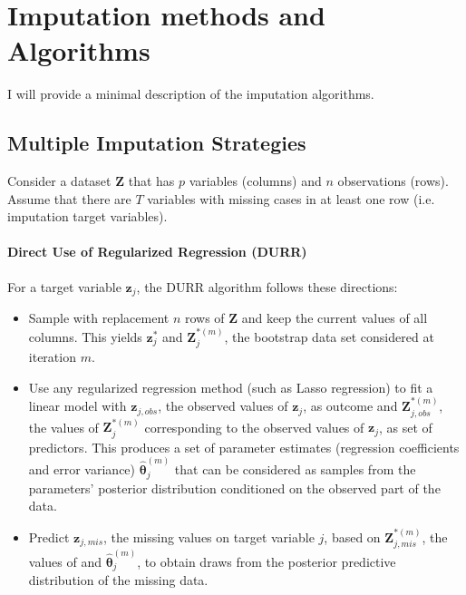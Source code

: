 \maketitle
\section{Imputation methods and Algorithms}

I will provide a minimal description of the imputation algorithms.

\subsection{Multiple Imputation Strategies}

	Consider a dataset $\bm{Z}$ that has $p$ variables (columns) and $n$ observations (rows).
	Assume that there are $T$ variables with missing cases in at least one row (i.e. imputation
	target variables).

\paragraph{Direct Use of Regularized Regression (DURR)}

	For a target variable $\bm{z}_j$, the DURR algorithm follows these directions:

	\begin{itemize}

	\item Sample with replacement $n$ rows of $\bm{Z}$ and keep the current values of all columns. This yields
		$\bm{z}_{j}^{*}$ and $\bm{Z}_{j}^{*(m)}$, the bootstrap data set considered at iteration $m$.

	\item Use any regularized regression method (such as Lasso regression) to fit a linear model with
		$\bm{z}_{j,obs}$, the observed values of $\bm{z}_j$, as outcome and $\bm{Z}_{j,obs}^{*(m)}$,
		the values of $\bm{Z}_{j}^{*(m)}$ corresponding to the observed values of $\bm{z}_j$, as 
		set of predictors. This produces a set of parameter estimates (regression coefficients and error variance)
		$\hat{\bm{\theta}}_{j}^{(m)}$ that can be considered as samples from the parameters' posterior 
		distribution conditioned on the observed part of the data.

	\item Predict $\bm{z}_{j,mis}$, the missing values on target variable $j$, based on 
		$\bm{Z}_{j,mis}^{*(m)}$, the values of and $\hat{\bm{\theta}}_{j}^{(m)}$,
		to obtain draws from the posterior predictive distribution of the missing data.

	\end{itemize}

